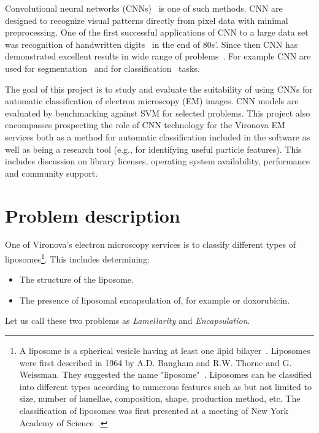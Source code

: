 \documentclass[a4paper, 11pt, table]{article}
\begin{document}
Convolutional neural networks (CNNs)~\cite{LeCun1986} is one of such methods. CNN are designed to recognize visual patterns directly from pixel data with minimal preprocessing. One of the first successful applications of CNN to a large data set was recognition of handwritten digits~\cite{41400} in the end of 80s'. Since then CNN has demonstrated excellent results in wide range of problems~\cite{NIPS2012_4824, DBLP:journals/corr/LinCY13}. For example CNN are used for segmentation~\cite{DBLP:journals/corr/ShelhamerLD16, Ronneberger2015} and for classification~\cite{NIPS2012_4824, DBLP:journals/corr/abs-1202-2745} tasks.

The goal of this project is to study and evaluate the suitability of using CNNs for automatic classification of electron microscopy (EM) images. CNN models are evaluated by benchmarking against SVM for selected problems. This project also encompasses prospecting the role of CNN technology for the Vironova EM services both as a method for automatic classification included in the software as well as being a research tool (e.g., for identifying useful particle features). This includes discussion on library licenses, operating system availability, performance and community support.

\section{Problem description}
\label{sec:problem_description}
One of Vironova's electron microscopy services is to classify different types of liposomes\footnote{A liposome is a spherical vesicle having at least one lipid bilayer~\cite{betageri1993liposome}. Liposomes were first described in 1964 by A.D. Bangham and R.W. Thorne and G. Weissman. They suggested the name "liposome"~\cite{betageri1993liposome}. Liposomes can be classified into different types according to numerous features such as but not limited to size, number of lamellae, composition, shape, production method, etc. The classification of liposomes was first presented at a meeting of New York Academy of Science~\cite{liposomes1978}.}. This includes determining:
\begin{itemize}
\item The structure of the liposome.
\item The presence of liposomal encapsulation of, for example or doxorubicin.
\end{itemize}

Let us call these two problems as \textit{Lamellarity} and \textit{Encapsulation}.\medskip
\end{document}

